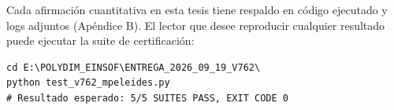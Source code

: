 Cada afirmación cuantitativa en esta tesis tiene respaldo en código ejecutado
y logs adjuntos (Apéndice B). El lector que desee reproducir cualquier resultado
puede ejecutar la suite de certificación:

\begin{verbatim}
cd E:\POLYDIM_EINSOF\ENTREGA_2026_09_19_V762\
python test_v762_mpeleides.py
# Resultado esperado: 5/5 SUITES PASS, EXIT CODE 0
\end{verbatim}
